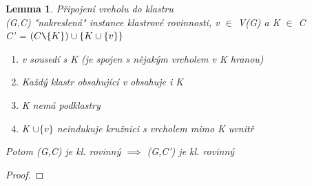 \documentclass[12pt,a4report]{report}
\newtheorem{lemma1}{Lemma}
\begin{document}
\begin{lemma1} Připojení vrcholu do klastru \\
(G,C) "nakreslená" instance klastrové rovinnosti, v $\in$ V(G) a K $\in$ C \\
C' = $(C \verb=\= \{K\}) \cup \{ K \cup \{v\} \}$
\begin{enumerate}
\item v sousedí s K (je spojen s nějakým vrcholem v K hranou)
\item Každý klastr obsahující v obsahuje i K
\item K nemá podklastry
\item K $\cup \{v\}$ neindukuje kružnici s vrcholem mimo K uvnitř
\end{enumerate}
Potom (G,C) je kl. rovinný $\implies$ (G,C') je kl. rovinný
\end{lemma1}
\begin{proof}
\end{proof}
\end{document}
